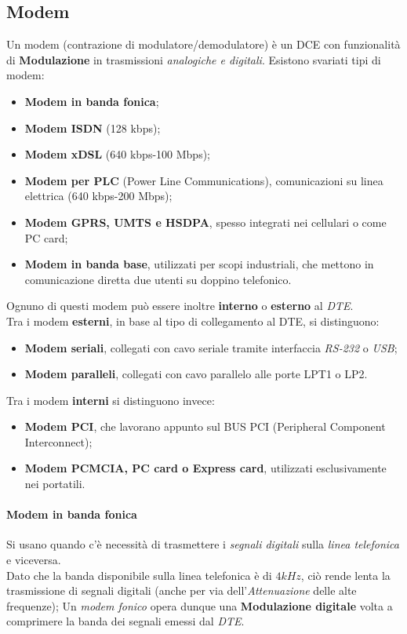 \documentclass[a4paper,11pt]{article}
\def\para#1{\paragraph{#1}\label{#1}}
\begin{document}
\subsection{Modem}
Un modem (contrazione di modulatore/demodulatore) è un DCE con funzionalità di \textbf{Modulazione} in trasmissioni \textit{analogiche e digitali}. Esistono svariati tipi di modem:
\begin{itemize}
\item \textbf{Modem in banda fonica};
\item \textbf{Modem ISDN} (128 kbps);
\item \textbf{Modem xDSL} (640 kbps-100 Mbps);
\item \textbf{Modem per PLC} (Power Line Communications), comunicazioni su linea elettrica (640 kbps-200 Mbps);
\item \textbf{Modem GPRS, UMTS e HSDPA}, spesso integrati nei cellulari o come PC card;
\item \textbf{Modem in banda base}, utilizzati per scopi industriali, che mettono in comunicazione diretta due utenti su doppino telefonico.
\end{itemize}
Ognuno di questi modem può essere inoltre \textbf{interno} o \textbf{esterno} al \textit{DTE}. \\Tra i modem \textbf{esterni}, in base al tipo di collegamento al DTE, si distinguono:
\begin{itemize}
\item \textbf{Modem seriali}, collegati con cavo seriale tramite interfaccia \textit{RS-232} o \textit{USB};
\item \textbf{Modem paralleli}, collegati con cavo parallelo alle porte LPT1 o LP2.
\end{itemize}
Tra i modem \textbf{interni} si distinguono invece:
\begin{itemize}
\item \textbf{Modem PCI}, che lavorano appunto sul BUS PCI (Peripheral Component Interconnect);
\item \textbf{Modem PCMCIA, PC card o Express card}, utilizzati esclusivamente nei portatili.
\end{itemize}
\para{Modem in banda fonica}
Si usano quando c'è necessità di trasmettere i \textit{segnali digitali }sulla \textit{linea telefonica }e viceversa. \\
Dato che la banda disponibile sulla linea telefonica è di $4 kHz$, ciò rende lenta la trasmissione di segnali digitali (anche per via dell'\textit{Attenuazione} delle alte frequenze); Un \textit{modem fonico }opera dunque una \textbf{Modulazione digitale} volta a comprimere la banda dei segnali emessi dal \textit{DTE}.
\newpage
\end{document}
